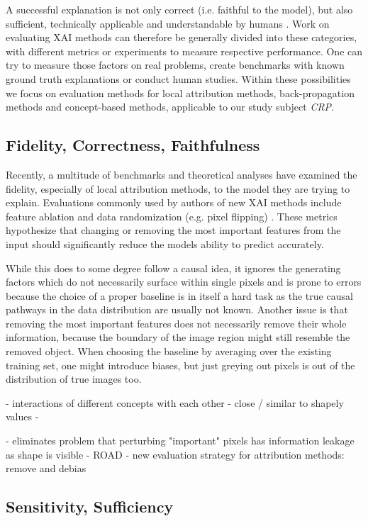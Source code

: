A successful explanation is not only correct (i.e. faithful to the model), but also sufficient, technically applicable and understandable by humans \cite{Samek2021}. Work on evaluating XAI methods can therefore be generally divided into these categories, with different metrics or experiments to measure respective performance. One can try to measure those factors on real problems, create benchmarks with known ground truth explanations or conduct human studies. Within these possibilities we focus on evaluation methods for local attribution methods, back-propagation methods and concept-based methods, applicable to our study subject \textit{CRP}.

\subsection{Fidelity, Correctness, Faithfulness}

Recently, a multitude of benchmarks and theoretical analyses have examined the fidelity, especially of local attribution methods, to the model they are trying to explain. Evaluations commonly used by authors of new XAI methods include feature ablation \cite{Samek2017} and data randomization (e.g. pixel flipping) \cite{Adebayo2018}. 
These metrics hypothesize that changing or removing the most important features from the input should significantly reduce the models ability to predict accurately.

While this does to some degree follow a causal idea, it ignores the generating factors which do not necessarily surface within single pixels and is prone to errors because the choice of a proper baseline is in itself a hard task as the true causal pathways in the data distribution are usually not known. Another issue is that removing the most important features does not necessarily remove their whole information, because the boundary of the image region might still resemble the removed object.
When choosing the baseline by averaging over the existing training set, one might introduce biases, but just greying out pixels is out of the distribution of true images too.

\cite{Bluecher2022}
- interactions of different concepts with each other
- close / similar to shapely values
-

\cite{Rong2022}
- eliminates problem that perturbing "important" pixels has information leakage as shape is visible
- ROAD
- new evaluation strategy for attribution methods: remove and debias


\subsection{Sensitivity, Sufficiency}
\cite{Wilming2023, Clark2023}



